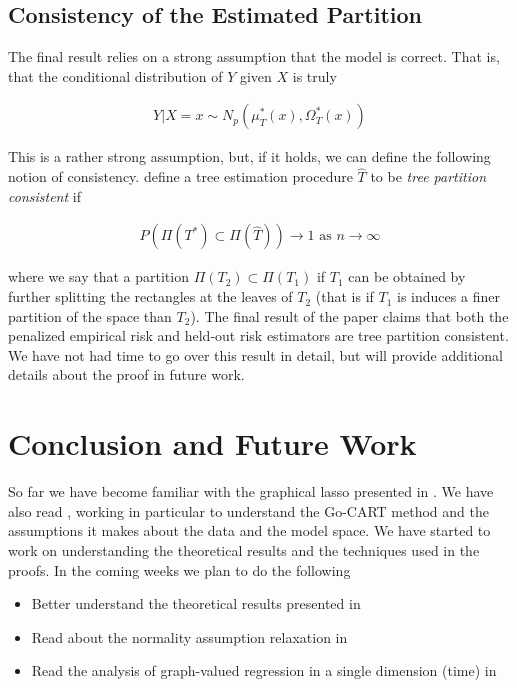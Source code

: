 \documentclass[12pt]{article}
\begin{document}
\subsection{Consistency of the Estimated Partition}

The final result relies on a strong assumption that the model is correct. That is, that the conditional distribution of $Y$ given $X$ is truly

\begin{align}
    Y | X = x \sim N_p(\mu^*_T(x), \Omega_T^*(x))
\end{align}

This is a rather strong assumption, but, if it holds, we can define the following notion of consistency. \cite{liu2010} define a tree estimation procedure $\hat{T}$ to be \textit{tree partition consistent} if

\begin{align}
    P \left(
        \Pi(T^*) \subset \Pi(\hat{T})
    \right) \to 1
    \text{ as } n \to \infty
\end{align}

where we say that a partition $\Pi(T_2) \subset \Pi(T_1)$ if $T_1$ can be obtained by further splitting the rectangles at the leaves of $T_2$ (that is if $T_1$ is induces a finer partition of the space than $T_2$). The final result of the paper claims that both the penalized empirical risk and held-out risk estimators are tree partition consistent. We have not had time to go over this result in detail, but will provide additional details about the proof in future work. 

\section{Conclusion and Future Work}

So far we have become familiar with the graphical lasso presented in \cite{friedman2008}. We have also read \cite{liu2009}, working in particular to understand the Go-CART method and the assumptions it makes about the data and the model space. We have started to work on understanding the theoretical results and the techniques used in the proofs. In the coming weeks we plan to do the following

\begin{itemize}
\item Better understand the theoretical results presented in \cite{liu2010}
\item Read about the normality assumption relaxation in \cite{liu2009}
\item Read the analysis of graph-valued regression in a single dimension (time) in \cite{zhou2010}
\end{itemize}
\end{document}
